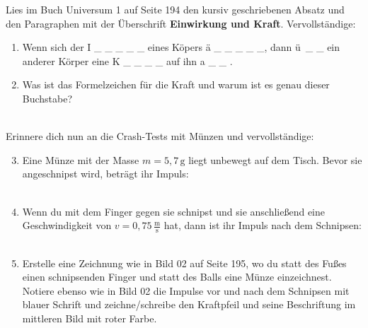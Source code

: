 \documentclass[task=1]{exercise}
\begin{document}
  Lies im Buch Universum 1 auf Seite 194 den kursiv geschriebenen Absatz und den Paragraphen mit der \"Uberschrift {\bfseries Einwirkung und Kraft}. Vervollst\"andige:
  \begin{enumerate}[label=\textnormal{\alph*)}]
    \item Wenn sich der I \_ \_ \_ \_ \_ eines K\"opers \"a \_ \_ \_ \_ \_, dann \"u\, \_ \_ ein anderer K\"orper eine K \_ \_ \_ \_ auf ihn a \_ \_ .
    \item Was ist das Formelzeichen f\"ur die Kraft und warum ist es genau dieser Buchstabe?\\~\\
  \end{enumerate}
  Erinnere dich nun an die Crash-Tests mit M\"unzen und vervollst\"andige:
  \begin{enumerate}[label=\textnormal{\alph*)}]
  \setcounter{enumi}{2}
    \item Eine M\"unze mit der Masse $m = 5{,}7\,\mathrm{g}$ liegt unbewegt auf dem Tisch. Bevor sie angeschnipst wird, betr\"agt ihr Impuls:\\~\\
    \item Wenn du mit dem Finger gegen sie schnipst und sie anschlie{\ss}end eine Geschwindigkeit von $v = 0{,}75\,\frac{\mathrm{m}}{\mathrm{s}}$ hat, dann ist ihr Impuls nach dem Schnipsen:\\~\\
    \item Erstelle eine Zeichnung wie in Bild 02 auf Seite 195, wo du statt des Fu{\ss}es einen schnipsenden Finger und statt des Balls eine M\"unze einzeichnest. Notiere ebenso wie in Bild 02 die Impulse vor und nach dem Schnipsen mit blauer Schrift und zeichne/schreibe den Kraftpfeil und seine Beschriftung im mittleren Bild mit roter Farbe.
  \end{enumerate}
  
  \newpage
  
\end{document}
